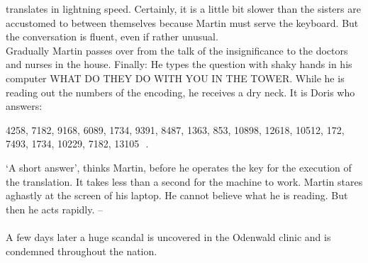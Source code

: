 translates in lightning speed. 
Certainly, it is a little bit slower than the sisters are accustomed to between themselves because Martin must 
serve the keyboard. 
But the conversation is fluent, even if rather unusual. \\ 
Gradually Martin passes over from the talk of the insignificance to the doctors and nurses in the house. 
Finally: He types the question with shaky hands in his computer WHAT DO THEY DO WITH YOU IN THE TOWER.
While he is reading out the numbers of the encoding, he receives a dry neck. 
It is Doris who answers: 
\begin{center} 
4258, 7182, 9168, 6089, 1734, 9391, 8487, 1363, 853, 10898, 12618, 10512, 172, 7493, 1734, 10229, 7182, 13105 \,\,. 
\end{center} 
`A short answer', thinks Martin, before he operates the key for the execution of the translation. 
It takes less than a second for the machine to work. 
Martin stares aghastly at the screen of his laptop. 
He cannot believe what he is reading. 
But then he acts rapidly. -- \\ \\ 
A few days later a huge scandal is uncovered in the Odenwald clinic and is condemned throughout the nation.

\[\]
\[\]
\[\]
\[\]
\hrulefill
\[\]
\[\]

